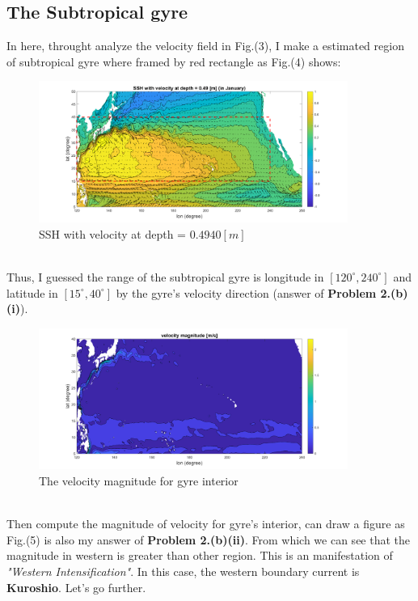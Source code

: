 \documentclass[12pt]{article}
\begin{document}
\begin{CJK*}{UTF8}{bsmi}
\subsection{The Subtropical gyre}
In here, throught analyze the velocity field in Fig.(3), I make a estimated region of subtropical gyre where framed by red rectangle as Fig.(4) shows: 
\begin{figure}[h]
 	\centering
	\includegraphics[width=0.9\textwidth]{Fig2b1.pdf}
	\caption{SSH with velocity at depth  = $0.4940 [m]$}
\end{figure}\\
Thus, I guessed the range of the subtropical gyre is longitude in $[120^\circ, 240^\circ]$ and latitude in $[15^\circ, 40^\circ]$ by the gyre's velocity direction (answer of \textbf{Problem 2.(b)(i)}).
\begin{figure}[h]
 	\centering
	\includegraphics[width=0.9\textwidth]{Fig2b2.pdf}
	\caption{The velocity magnitude for gyre interior}
\end{figure}\\
Then compute the magnitude of velocity for gyre's interior, can draw a figure as Fig.(5) is also my answer of \textbf{Problem 2.(b)(ii)}. From which we can see that the magnitude in western is greater than other region. This is an manifestation of \textit{"Western Intensification"}. In this case, the western boundary current is \textbf{Kuroshio}. Let's go further.

\end{CJK*}
\end{document}
